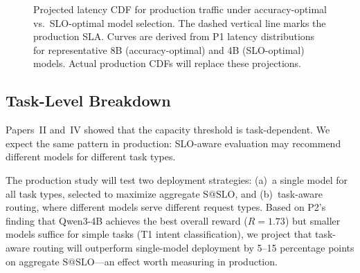 \documentclass[11pt]{article}
\makeatletter
\newcommand{\sslo}{\ensuremath{\mathrm{S@SLO}}}
\makeatother
\begin{document}
\begin{figure}[t]
\centering
{}
\caption{Projected latency CDF for production traffic under accuracy-optimal vs.\ SLO-optimal model selection. The dashed vertical line marks the production SLA. Curves are derived from P1 latency distributions for representative 8B (accuracy-optimal) and 4B (SLO-optimal) models. Actual production CDFs will replace these projections.}
\label{fig:latency-cdf}
\end{figure}

\subsection{Task-Level Breakdown}

Papers~II and~IV showed that the capacity threshold is task-dependent. We expect the same pattern in production: SLO-aware evaluation may recommend different models for different task types.

The production study will test two deployment strategies: (a)~a single model for all task types, selected to maximize aggregate $\sslo{}$, and (b)~task-aware routing, where different models serve different request types. Based on P2's finding that Qwen3-4B achieves the best overall reward ($R = 1.73$) but smaller models suffice for simple tasks (T1 intent classification), we project that task-aware routing will outperform single-model deployment by 5--15 percentage points on aggregate $\sslo{}$---an effect worth measuring in production.
\end{document}
